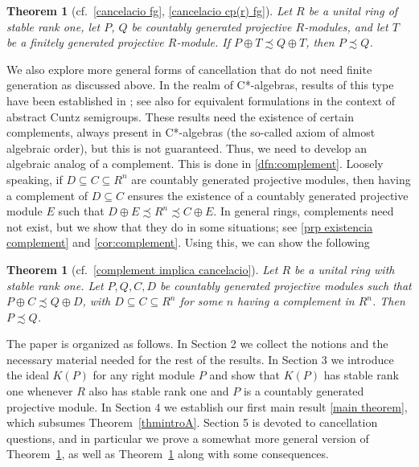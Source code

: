 \documentclass[11pt]{amsart}
\numberwithin{equation}{section}
\theoremstyle{definition}
\theoremstyle{plain}
\newcounter{thmintroctr}
\newtheorem{thmintro}[thmintroctr]{Theorem}
\theoremstyle{definition}
\begin{document}
\begin{thmintro}[cf.~\ref{cancelacio fg}, \ref{cancelacio cp(r) fg}]
\label{thmintro B}
Let $R$ be a unital ring of stable rank one, let $P$, $Q$ be countably generated projective $R$-modules, and let $T$ be a finitely generated projective $R$-module. If $P\oplus T\precsim Q\oplus T$, then $P\precsim Q$. 
\end{thmintro}

We also explore more general forms of cancellation that do not need finite generation as discussed above. In the realm of C*-algebras, results of this type have been established in \cite[Theorem 4.3]{RorWin10ZRevisited}; see also \cite[Lemma 2.5]{AntPerRobThi22} for equivalent formulations in the context of abstract Cuntz semigroups. These results need the existence of certain complements, always present in C*-algebras (the so-called axiom of almost algebraic order), but this is not guaranteed. Thus, we need to develop an algebraic analog of a complement. This is done in \autoref{dfn:complement}. Loosely speaking, if $D\subseteq C\subseteq R^n$ are countably generated projective modules, then having a complement of $D\subseteq C$ ensures the existence of a countably generated projective module $E$ such that $D\oplus E\precsim R^n\precsim C\oplus E$. In general rings, complements need not exist, but we show that they do in some situations; see \autoref{prp existencia complement} and \autoref{cor:complement}. Using this, we can show the following
\begin{thmintro}[cf.~\ref{complement implica cancelacio}]
\label{thmintroC}
Let $R$ be a unital ring with stable rank one. %
Let $P,Q,C,D$ be countably generated projective modules such that $P\oplus C\precsim Q\oplus D$, with $D\subseteq C\subseteq R^n$ for some $n$ having a complement in $R^n$. Then $P\precsim Q$.
\end{thmintro}

The paper is organized as follows. In Section 2 we collect the notions and the necessary material needed for the rest of the results. In Section 3 we introduce the ideal $K(P)$ for any right module $P$ and show that $K(P)$ has stable rank one whenever $R$ also has stable rank one and $P$ is a countably generated projective module. In Section 4 we establish our first main result \autoref{main theorem}, which subsumes Theorem~\ref{thmintroA}. Section 5 is devoted to cancellation questions, and in particular we prove a somewhat more general version of Theorem~\ref{thmintro B}, as well as Theorem~\ref{thmintroC} along with some consequences.
\end{document}

